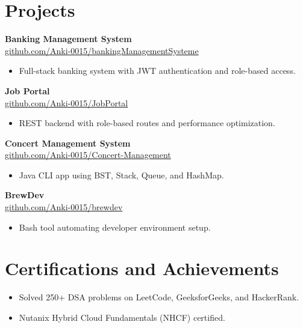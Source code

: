 \documentclass[a4paper,10pt]{article}
\begin{document}
\section*{Projects}
\textbf{Banking Management System}\\
\href{https://github.com/Anki-0015/bankingManagementSysteme}{github.com/Anki-0015/bankingManagementSysteme}
\begin{itemize}
  \item Full-stack banking system with JWT authentication and role-based access.
\end{itemize}

\textbf{Job Portal}\\
\href{https://github.com/Anki-0015/JobPortal}{github.com/Anki-0015/JobPortal}
\begin{itemize}
  \item REST backend with role-based routes and performance optimization.
\end{itemize}

\textbf{Concert Management System}\\
\href{https://github.com/Anki-0015/Concert-Management}{github.com/Anki-0015/Concert-Management}
\begin{itemize}
  \item Java CLI app using BST, Stack, Queue, and HashMap.
\end{itemize}

\textbf{BrewDev}\\
\href{https://github.com/Anki-0015/brewdev}{github.com/Anki-0015/brewdev}
\begin{itemize}
  \item Bash tool automating developer environment setup.
\end{itemize}

\section*{Certifications and Achievements}
\begin{itemize}
  \item Solved 250+ DSA problems on LeetCode, GeeksforGeeks, and HackerRank.
  \item Nutanix Hybrid Cloud Fundamentals (NHCF) certified.
\end{itemize}
\end{document}
